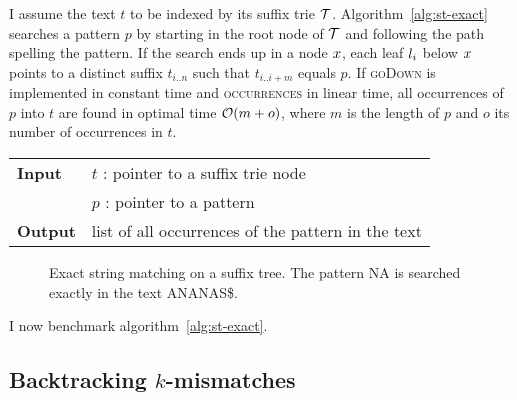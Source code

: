 I assume the text $t$ to be indexed by its suffix trie $\mathcal {T}$.
Algorithm~\ref{alg:st-exact} searches a pattern $p$ by starting in the root node of $\mathcal {T}$ and following the path spelling the pattern.
If the search ends up in a node $x$, each leaf $l_i$ below $x$ points to a distinct suffix $t_{i..n}$ such that $t_{i..i+m}$ equals $p$.
If \textsc{goDown} is implemented in constant time and \textsc{occurrences} in linear time, all occurrences of $p$ into $t$ are found in optimal time $\mathcal{O}(m+o)$, where $m$ is the length of $p$ and $o$ its number of occurrences in $t$.

\begin{center}
\begin{minipage}[t]{.7\textwidth}
\begin{algorithm}[H]
\begin{tabular}{ll}
\textbf{Input}  & $t$ : pointer to a suffix trie node\\
				& $p$ : pointer to a pattern\\
\textbf{Output} & list of all occurrences of the pattern in the text\\
\end{tabular}
\begin{algorithmic}[1]
	\State \Report {}
		\State {}
\EndIf
\end{algorithmic}
\label{alg:st-exact}
\end{algorithm}
\end{minipage}
\end{center}

\begin{figure}[h]
\begin{center}
\caption[Exact string matching on a suffix tree]{Exact string matching on a suffix tree. The pattern NA is searched exactly in the text ANANAS\$.}
\label{fig:st-exact}

\end{center}
\end{figure}

I now benchmark algorithm~\ref{alg:st-exact}.

\subsection{Backtracking $k$-mismatches}

